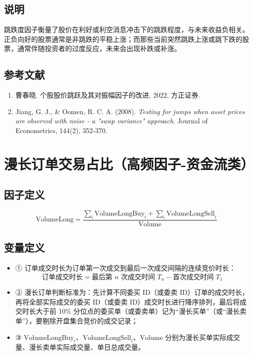 \documentclass{article}
\begin{document}
\subsection{说明}
跳跌度因子衡量了股价在利好或利空消息冲击下的跳跌程度，与未来收益负相关。正负向好的股票通常是非跳跌的平稳上涨；而那些当前突然跳跌上涨或跳下跌的股票，通常伴随投资者的过度反应，未来会出现补跌或补涨。

\subsection{参考文献}
\begin{enumerate}
    \item 曹春晓. 个股股价跳跃及其对振幅因子的改进, 2022, 方正证券.
    \item Jiang, G. J., \& Oomen, R. C. A. (2008). \textit{Testing for jumps when asset prices are observed with noise - a "swap variance" approach}. Journal of Econometrics, 144(2), 352-370.
\end{enumerate}

\section{漫长订单交易占比（高频因子-资金流类）}

\subsection{因子定义}
\begin{equation}
    \mathrm{VolumeLong} = \frac{\sum_i \mathrm{VolumeLongBuy}_i + \sum_i \mathrm{VolumeLongSell}_i}{\mathrm{Volume}}
\end{equation}

\subsection{变量定义}
\begin{itemize}
    \item ① 订单成交时长为订单第一次成交到最后一次成交间隔的连续竞价时长：
        \begin{equation*}
            \text{订单成交时长} = \text{最后第 } n \text{ 次成交时间 } T_n - \text{首次成交时间 } T_1
        \end{equation*}
    \item ② 漫长订单判断标准为：先计算不同委买 ID（或委卖 ID）订单的成交时长，再将全部实际成交的委买 ID（或委卖 ID）成交时长进行降序排列，最后将成交时长大于前 10\% 分位点的委买单（或委卖单）记为“漫长买单”（或“漫长卖单”），要剔除开盘集合竞价的成交记录；
    \item ③ \( \mathrm{VolumeLongBuy}_i \)、\( \mathrm{VolumeLongSell}_i \)、\( \mathrm{Volume} \) 分别为漫长买单实际成交量、漫长卖单实际成交量、单日总成交量。
\end{itemize}
\end{document}
